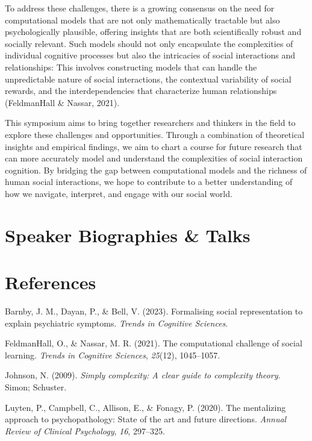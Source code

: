 \documentclass[10pt, letterpaper]{article}
\newenvironment{CSLReferences}%
  {}%
  {\par}
\begin{document}
To address these challenges, there is a growing consensus on the need
for computational models that are not only mathematically tractable but
also psychologically plausible, offering insights that are both
scientifically robust and socially relevant. Such models should not only
encapsulate the complexities of individual cognitive processes but also
the intricacies of social interactions and relationships: This involves
constructing models that can handle the unpredictable nature of social
interactions, the contextual variability of social rewards, and the
interdependencies that characterize human relationships (FeldmanHall \&
Nassar, 2021).

This symposium aims to bring together researchers and thinkers in the
field to explore these challenges and opportunities. Through a
combination of theoretical insights and empirical findings, we aim to
chart a course for future research that can more accurately model and
understand the complexities of social interaction cognition. By bridging
the gap between computational models and the richness of human social
interactions, we hope to contribute to a better understanding of how we
navigate, interpret, and engage with our social world.

\hypertarget{speaker-biographies-talks}{%
\section{Speaker Biographies \& Talks}\label{speaker-biographies-talks}}

\hypertarget{references}{%
\section{References}\label{references}}

\setlength{\parindent}{-0.1in} 
\setlength{\leftskip}{0.125in}

\noindent

\hypertarget{refs}{}
\begin{CSLReferences}{1}{0}
\leavevmode{}%
Barnby, J. M., Dayan, P., \& Bell, V. (2023). Formalising social
representation to explain psychiatric symptoms. \emph{Trends in
Cognitive Sciences}.

\leavevmode{}%
FeldmanHall, O., \& Nassar, M. R. (2021). The computational challenge of
social learning. \emph{Trends in Cognitive Sciences}, \emph{25}(12),
1045--1057.

\leavevmode{}%
Johnson, N. (2009). \emph{Simply complexity: A clear guide to complexity
theory}. Simon; Schuster.

\leavevmode{}%
Luyten, P., Campbell, C., Allison, E., \& Fonagy, P. (2020). The
mentalizing approach to psychopathology: State of the art and future
directions. \emph{Annual Review of Clinical Psychology}, \emph{16},
297--325.

\end{CSLReferences}


\end{document}
